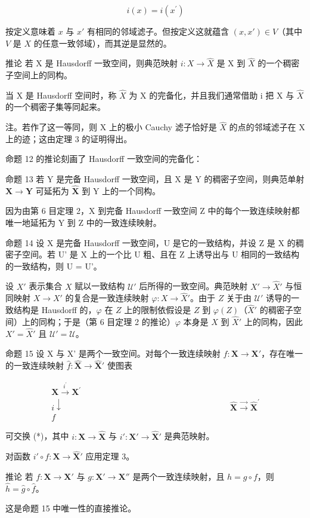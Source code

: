 \[
i (x) = i \left(x ^ {\prime}\right)
\]

按定义意味着 \(x\) 与 \(x'\) 有相同的邻域滤子。但按定义这就蕴含 \((x, x') \in V\)（其中 \(V\) 是 \(X\) 的任意一致邻域），而其逆是显然的。

推论 若 X 是 Hausdorff 一致空间，则典范映射 \(i: X \to \hat{X}\) 是 X 到 \(\hat{X}\) 的一个稠密子空间上的同构。

当 X 是 Hausdorff 空间时，称 \(\hat{X}\) 为 X 的完备化，并且我们通常借助 i 把 X 与 \(\hat{X}\) 的一个稠密子集等同起来。

注。若作了这一等同，则 X 上的极小 Cauchy 滤子恰好是 \(\hat{X}\) 的点的邻域滤子在 X 上的迹；这由定理 3 的证明得出。

命题 12 的推论刻画了 Hausdorff 一致空间的完备化：

命题 13 若 Y 是完备 Hausdorff 一致空间，且 X 是 Y 的稠密子空间，则典范单射 \(\mathbf{X} \to \mathbf{Y}\) 可延拓为 \(\hat{\mathbf{X}}\) 到 Y 上的一个同构。

因为由第 6 目定理 2，X 到完备 Hausdorff 一致空间 Z 中的每个一致连续映射都唯一地延拓为 Y 到 Z 中的一致连续映射。

命题 14 设 X 是完备 Hausdorff 一致空间，U 是它的一致结构，并设 Z 是 X 的稠密子空间。若 U' 是 X 上的一个比 U 粗、且在 Z 上诱导出与 U 相同的一致结构的一致结构，则 U = U'。

设 \(X'\) 表示集合 \(X\) 赋以一致结构 \(\mathcal{U}'\) 后所得的一致空间。典范映射 \(X' \to \hat{X}'\) 与恒同映射 \(X \to X'\) 的复合是一致连续映射 \(\varphi: X \to \hat{X}'\)。由于 \(Z\) 关于由 \(\mathcal{U}'\) 诱导的一致结构是 Hausdorff 的，\(\varphi\) 在 \(Z\) 上的限制依假设是 \(Z\) 到 \(\varphi(Z)\)（\(\hat{X}'\) 的稠密子空间）上的同构；于是（第 6 目定理 2 的推论）\(\varphi\) 本身是 \(X\) 到 \(\hat{X}'\) 上的同构，因此 \(X' = \hat{X}'\) 且 \(\mathcal{U}' = \mathcal{U}\)。

命题 15 设 X 与 X' 是两个一致空间。对每个一致连续映射 \(f: \mathbf{X} \to \mathbf{X}'\)，存在唯一的一致连续映射 \(\hat{f}: \hat{\mathbf{X}} \to \hat{\mathbf{X}}'\) 使图表

\[
\begin{array}{c}\mathbf {X} \stackrel {{i ^ {\prime}}} {{\to}} \mathbf {X} ^ {\prime}\\i \downarrow \quad \quad \quad \quad \quad \quad \quad \quad \quad \quad \quad \quad \quad \quad \quad \quad \quad \quad \quad \quad \hat {\mathbf {X}} \stackrel {{\rightarrow}} {{\longrightarrow}} \hat {\mathbf {X}} ^ {\prime}\\f\end{array}
\]

可交换 (*)，其中 \(i: \mathbf{X} \to \hat{\mathbf{X}}\) 与 \(i': \mathbf{X}' \to \hat{\mathbf{X}}'\) 是典范映射。

对函数 \(i' \circ f: \mathbf{X} \to \hat{\mathbf{X}}'\) 应用定理 3。

推论 若 \(f: \mathbf{X} \to \mathbf{X}'\) 与 \(g: \mathbf{X}' \to \mathbf{X}''\) 是两个一致连续映射，且 \(h = g \circ f\)，则 \(\hat{h} = \hat{g} \circ \hat{f}\)。

这是命题 15 中唯一性的直接推论。

